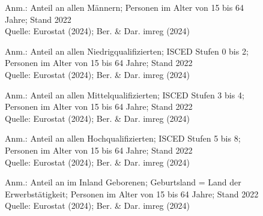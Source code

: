 \begin{figure}[p]
	{\centering {}}
	\label{map:erwerbmaenner}
	\begin{spacing}{1} \scriptsize
		Anm.: Anteil an allen Männern; Personen im Alter von 15 bis 64 Jahre; Stand 2022\\
		Quelle: Eurostat (2024); Ber. \& Dar. imreg (2024) \end{spacing}
\end{figure}


\begin{figure}[p]
	{\centering {}}
	\label{map:erwerbniedrig}
	\begin{spacing}{1} \scriptsize
		Anm.: Anteil an allen Niedrigqualifizierten; ISCED Stufen 0 bis 2; Personen im Alter von 15 bis 64 Jahre; Stand 2022\\
		Quelle: Eurostat (2024); Ber. \& Dar. imreg (2024) \end{spacing}
\end{figure}


\begin{figure}[p]
	{\centering {}}
	\label{map:erwerbmittel}
	\begin{spacing}{1} \scriptsize
		Anm.: Anteil an allen Mittelqualifizierten; ISCED Stufen 3 bis 4; Personen im Alter von 15 bis 64 Jahre; Stand 2022\\
		Quelle: Eurostat (2024); Ber. \& Dar. imreg (2024) \end{spacing}
\end{figure}

\begin{figure}[p]
	{\centering {}}
	\label{map:erwerbhoch}
	\begin{spacing}{1} \scriptsize
		Anm.: Anteil an allen Hochqualifizierten; ISCED Stufen 5 bis 8; Personen im Alter von 15 bis 64 Jahre; Stand 2022\\
		Quelle: Eurostat (2024); Ber. \& Dar. imreg (2024) \end{spacing}
\end{figure}


\begin{figure}[p]
	{\centering {}}
	\label{map:erwerbinland}
	\begin{spacing}{1} \scriptsize
		Anm.: Anteil an im Inland Geborenen; Geburtsland = Land der Erwerbstätigkeit; Personen im Alter von 15 bis 64 Jahre; Stand 2022\\
		Quelle: Eurostat (2024); Ber. \& Dar. imreg (2024) \end{spacing}
\end{figure}


